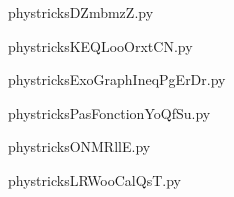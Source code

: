
    \newcommand{\CaptionFigDZmbmzZ}{<+Type your caption here+>}
    \begin{center}
        
    \end{center}
    phystricksDZmbmzZ.py

    

    \clearpage
    


    \newcommand{\CaptionFigKEQLooOrxtCN}{<+Type your caption here+>}
    \begin{center}
        
    \end{center}
    phystricksKEQLooOrxtCN.py

    

    \clearpage
    


    \newcommand{\CaptionFigExoGraphIneqPgErDr}{<+Type your caption here+>}
    \begin{center}
        
    \end{center}
    phystricksExoGraphIneqPgErDr.py

    

    \clearpage
    


    \newcommand{\CaptionFigPasFonctionYoQfSu}{<+Type your caption here+>}
    \begin{center}
        
    \end{center}
    phystricksPasFonctionYoQfSu.py

    

    \clearpage
    


    \newcommand{\CaptionFigONMRllE}{<+Type your caption here+>}
    \begin{center}
        
    \end{center}
    phystricksONMRllE.py

    

    \clearpage
    


    \newcommand{\CaptionFigLRWooCalQsT}{<+Type your caption here+>}
    \begin{center}
        
    \end{center}
    phystricksLRWooCalQsT.py

